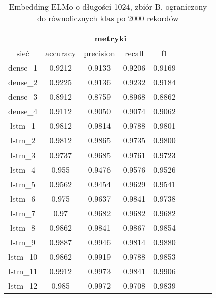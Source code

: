 \begin{table}[p] \label{tab:wyniki_elmo_B_lim} \centering
    \caption{Embedding ELMo o długości 1024, zbiór B, ograniczony do równolicznych klas po 2000 rekordów}
    \begin{tabular} {|c|c|c|c|c|c|c|c|c| }    \hline
                 & \multicolumn{4}{c|}{metryki}                               \\ \hline
        sieć     & accuracy                     & precision & recall & f1     \\ \hline
        dense\_1 & 0.9212                       & 0.9133    & 0.9206 & 0.9169 \\ \hline
        dense\_2 & 0.9225                       & 0.9136    & 0.9232 & 0.9184 \\ \hline
        dense\_3 & 0.8912                       & 0.8759    & 0.8968 & 0.8862 \\ \hline
        dense\_4 & 0.9112                       & 0.9050    & 0.9074 & 0.9062 \\ \hline
        lstm\_1  & 0.9812                       & 0.9814    & 0.9788 & 0.9801 \\ \hline
        lstm\_2  & 0.9812                       & 0.9865    & 0.9735 & 0.9800 \\ \hline
        lstm\_3  & 0.9737                       & 0.9685    & 0.9761 & 0.9723 \\ \hline
        lstm\_4  & 0.955                        & 0.9476    & 0.9576 & 0.9526 \\ \hline
        lstm\_5  & 0.9562                       & 0.9454    & 0.9629 & 0.9541 \\ \hline
        lstm\_6  & 0.975                        & 0.9637    & 0.9841 & 0.9738 \\ \hline
        lstm\_7  & 0.97                         & 0.9682    & 0.9682 & 0.9682 \\ \hline
        lstm\_8  & 0.9862                       & 0.9841    & 0.9867 & 0.9854 \\ \hline
        lstm\_9  & 0.9887                       & 0.9946    & 0.9814 & 0.9880 \\ \hline
        lstm\_10 & 0.9862                       & 0.9919    & 0.9788 & 0.9853 \\ \hline
        lstm\_11 & 0.9912                       & 0.9973    & 0.9841 & 0.9906 \\ \hline
        lstm\_12 & 0.985                        & 0.9972    & 0.9708 & 0.9839 \\ \hline

\end{tabular}
\end{table}
